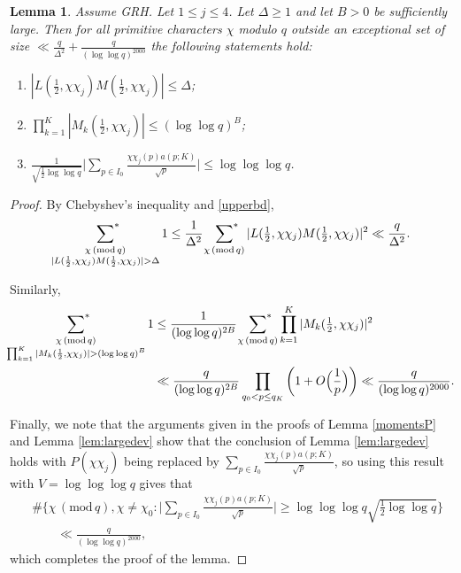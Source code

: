 \documentclass[12pt, reqno]{amsart}
\renewcommand{\pmod}[1]{\,(\mathrm{mod}\,#1)}
\newtheorem{lemma}[theorem]{Lemma}
\numberwithin{equation}{section}
\numberwithin{theorem}{section}
\numberwithin{equation}{section}
\def\sumstar{\sideset{}{^*}\sum}
\begin{document}
\begin{lemma} \label{lem:cheby} Assume GRH. Let $1\leq j\leq 4$.
Let $\Delta \ge 1$ and let $B>0$ be sufficiently large.
Then for all primitive characters $\chi$ modulo $q$ outside an exceptional set of size $\ll \frac{q}{\Delta^2}+\frac{q}{(\log \log q)^{2000}}$ the following statements hold:
\begin{enumerate}
    \item  $ \displaystyle |L(\tfrac12,\chi\chi_j)M(\tfrac12,\chi\chi_j)| \le \Delta$;
    \item $\displaystyle \prod_{k=1}^K |M_{k}(\tfrac12,\chi\chi_j)| \le (\log \log q)^B$;
    \item $ \displaystyle \frac{1}{\sqrt{\frac12\log \log q}}\bigg| \sum_{p\in I_0} \frac{ \chi\chi_j(p)a(p;K)}{ \sqrt{p}} \bigg|\le \log \log \log q $.
\end{enumerate}
\end{lemma}
\begin{proof}

By Chebyshev's inequality and \eqref{upperbd},
\[
\sumstar_{\substack{\chi \pmod q \\ |L(\frac12,\chi\chi_j)M(\frac12,\chi\chi_j)| > \Delta} } 1  \le \frac{1}{\Delta^2}\ \sumstar_{\chi \pmod q} |L(\tfrac12,\chi\chi_j)M(\tfrac12,\chi\chi_j)|^2 \ll \frac{q}{\Delta^2}.
\]

Similarly,
\begin{align*}
\sumstar_{\substack{\chi \pmod q \\  \prod_{k=1}^K |M_{k}(\frac12,\chi\chi_j)| > (\log \log q)^B} } 1 &\le \frac{1}{(\log \log q)^{2B}} \ \sumstar_{\chi \pmod q} \prod_{k=1}^K |M_{k}(\tfrac12,\chi\chi_j)|^2  \\
&\ll   \frac{q}{(\log \log q)^{2B}} \prod_{q_0< p \le q_K}\bigg( 1+O\Big( \frac{1}{p}\Big)\bigg) \ll \frac{q}{(\log \log q)^{2000}}.
\end{align*}

Finally, we note that the arguments given in the proofs of Lemma \ref{momentsP} and Lemma \ref{lem:largedev} show that the conclusion of Lemma \ref{lem:largedev} holds with $P(\chi\chi_j)$ being replaced by $\sum_{p\in I_0} \frac{\chi\chi_j(p)a(p;K)}{ \sqrt{p}}$, so using this result with $V=\log \log \log q$ gives that
\begin{align*}
&\# \bigg\{ \chi \pmod q,\chi\ne\chi_0 : \bigg|\sum_{p\in I_0} \frac{\chi\chi_j(p)a(p;K)}{ \sqrt{p}} \bigg| \ge \log \log \log q \sqrt{\frac12\log \log q} \bigg\}\\
&\qquad \ll \frac{q}{(\log \log q)^{2000}}, 
\end{align*}
which completes the proof of the lemma.
\end{proof}
\end{document}
